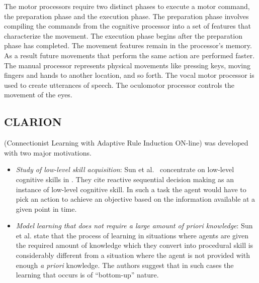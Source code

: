 The motor processors require two distinct phases to execute a motor
command, the preparation phase and the execution phase. The
preparation phase involves compiling the commands from the cognitive
processor into a set of features that characterize the movement. The
execution phase begins after the preparation phase has completed. The
movement features remain in the processor's memory.  As a result
future movements that perform the same action are performed
faster. The manual processor represents physical movements like
pressing keys, moving fingers and hands to another location, and so
forth. The vocal motor processor is used to create utterances of
speech. The oculomotor processor controls the movement of the eyes.

\subsection{CLARION}
\clarion (Connectionist Learning with Adaptive Rule Induction ON-line)
\cite{journals/cogsci/SunMP01} was developed with two major
motivations. 

\begin{itemize}
\item \emph{Study of low-level skill acquisition}: Sun
  et al.~\cite{journals/cogsci/SunMP01} concentrate on low-level cognitive
  skills in \clarion.  They cite reactive
  sequential decision making as an instance of low-level cognitive
  skill. In such a task the agent would have to pick an action to
  achieve an objective based on the information available at a
  given point in time.
\item \emph{Model learning that does not require a large amount of
    priori knowledge}: Sun et al. state that the process of learning
  in situations where agents are given the required amount of
  knowledge which they convert into procedural skill is considerably
  different from a situation where the agent is not provided with
  enough {\em a priori} knowledge. The authors suggest that in such
  cases the learning that occurs is of ``bottom-up'' nature.
\end{itemize}

